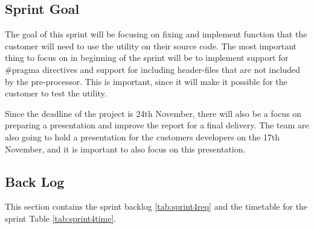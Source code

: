 \subsection{Sprint Goal}
The goal of this sprint will be focusing on fixing and implement function that the customer will need to use the utility on their source code. The most important thing to focus on in beginning of the sprint will be to implement support for \#pragma directives and support for including header-files that are not included by the pre-processor. This is important, since it will make it possible for the customer to test the utility.

Since the deadline of the project is 24th November, there will also be a focus on preparing a presentation and improve the report for a final delivery. The team are also going to hold a presentation for the customers developers on the 17th November, and it is important to also focus on this presentation.

\subsection{Back Log}
This section contains the sprint backlog \ref{tab:sprint4req} and the timetable for the sprint Table \ref{tab:sprint4time}.  

